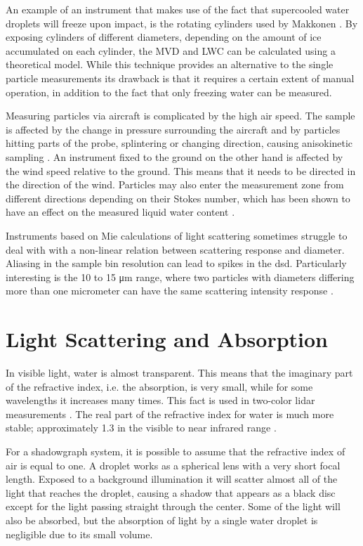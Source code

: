 An example of an instrument that makes use of the fact that supercooled water droplets will freeze upon impact, is the rotating cylinders used by Makkonen \cite{makk1992}. By exposing cylinders of different diameters, depending on the amount of ice accumulated on each cylinder, the MVD and LWC can be calculated using a theoretical model. While this technique provides an alternative to the single particle measurements its drawback is that it requires a certain extent of manual operation, in addition to the fact that only freezing water can be measured.

Measuring particles via aircraft is complicated by the high air speed. The sample is affected by the change in pressure surrounding the aircraft and by particles hitting parts of the probe, splintering or changing direction, causing anisokinetic sampling \cite{baum2011}. An instrument fixed to the ground on the other hand is affected by the wind speed relative to the ground. This means that it needs to be directed in the direction of the wind. Particles may also enter the measurement zone from different directions depending on their Stokes number, which has been shown to have an effect on the measured liquid water content \cite{henn2013}.

Instruments based on Mie calculations of light scattering sometimes struggle to deal with with a non-linear relation between scattering response and diameter. Aliasing in the sample bin resolution can lead to spikes in the \gls{dsd}. Particularly interesting is the 10 to 15 μm range, where two particles with diameters differing more than one micrometer can have the same scattering intensity response \cite{dye1984,spie2012,bohr2008}.

\section{Light Scattering and Absorption}

In visible light, water is almost transparent. This means that the imaginary part of the refractive index, i.e. the absorption, is very small, while for some wavelengths it increases many times. This fact is used in two-color lidar measurements \cite{west2010}. The real part of the refractive index for water is much more stable; approximately 1.3 in the visible to near infrared range \cite{hale1973, kou1993}. 

For a shadowgraph system, it is possible to assume that the refractive index of air is equal to one. A droplet works as a spherical lens with a very short focal length. Exposed to a background illumination it will scatter almost all of the light that reaches the droplet, causing a shadow that appears as a black disc except for the light passing straight through the center. Some of the light will also be absorbed, but the absorption of light by a single water droplet is negligible due to its small volume.

